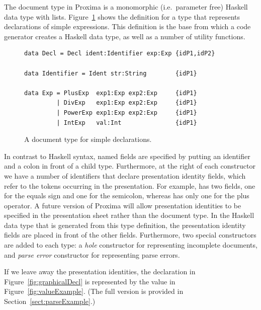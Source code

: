 \documentclass[12pt]{article}
\begin{document}
The document type in Proxima is a monomorphic (i.e.\ parameter free) Haskell data type with lists. Figure~\ref{fig:docType} shows the definition for a type  that represents declarations of simple expressions. This definition is the base from which a code generator creates a Haskell data type, as well as a number of utility functions.

\begin{figure}
\begin{center}
\begin{footnotesize}
\begin{verbatim}
data Decl = Decl ident:Identifier exp:Exp {idP1,idP2}

data Identifier = Ident str:String        {idP1}

data Exp = PlusExp  exp1:Exp exp2:Exp     {idP1}
         | DivExp   exp1:Exp exp2:Exp     {idP1}
         | PowerExp exp1:Exp exp2:Exp     {idP1}
         | IntExp   val:Int               {idP1}
\end{verbatim}
\end{footnotesize}
\end{center}
\caption{A document type for simple declarations.} \label{fig:docType} 
\end{figure}

In contrast to Haskell syntax, named fields are specified by putting an identifier and a colon in front of a child type. Furthermore, at the right of each constructor we have a number of identifiers that declare presentation identity fields, which refer to the tokens occurring in the presentation. For example,  has two fields, one for the equals sign and one for the semicolon, whereas  has only one for the plus operator. A future version of Proxima will allow presentation identities to be specified in the presentation sheet rather than the document type. In the Haskell data type that is generated from this type definition, the presentation identity fields are placed in front of the other fields. Furthermore, two special constructors are added to each type: a {\em hole} constructor for representing incomplete documents, and  {\em parse error} constructor for representing parse errors.

If we leave away the presentation identities, the declaration in Figure~\ref{fig:graphicalDecl} is represented by the value in Figure~\ref{fig:valueExample}. (The full version is provided in Section~\ref{sect:parseExample}.)
\end{document}
